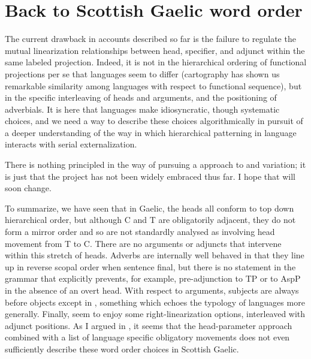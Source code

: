 \documentclass[output=paper,colorlinks,citecolor=brown]{langscibook}
\begin{document}
\section{Back to Scottish Gaelic word order}\label{sec:ramchand:5}

The current drawback in  accounts described so far is the failure to regulate the mutual linearization relationships between head, specifier, and adjunct within the same labeled projection. Indeed, it is not in the hierarchical ordering of functional projections per se that languages seem to differ (cartography has shown us remarkable similarity among languages with respect to functional sequence), but in the specific interleaving of heads and arguments, and the positioning of adverbials. It is here that languages make idiosyncratic, though systematic choices, and we need a way to describe these choices algorithmically  in pursuit of a deeper understanding of the way in which hierarchical patterning in language interacts with serial externalization.

There is nothing principled in the way of pursuing a  approach to  and variation; it is just that the project has not been widely embraced thus far.  I hope that will soon change. 

To summarize, we have seen that in Gaelic, the heads all conform to top down hierarchical order, but although C and T are obligatorily adjacent, they do not form a mirror order and so are not standardly analysed as involving head movement from T to C.  There are no arguments or adjuncts that intervene within this stretch of heads. Adverbs are internally well behaved in that they line up in reverse scopal order when sentence final, but there is no statement in the grammar that explicitly prevents, for example, pre-adjunction to TP or to AspP in the absence of an overt head. With respect to arguments,  subjects are always before objects except in , something which echoes the typology of  languages more generally.  Finally,  seem to enjoy some right-linearization options, interleaved with adjunct positions.  As I argued in , it seems that the head-parameter approach combined with a list of language specific obligatory movements does not even sufficiently describe  these word order choices in Scottish Gaelic. 
\end{document}
